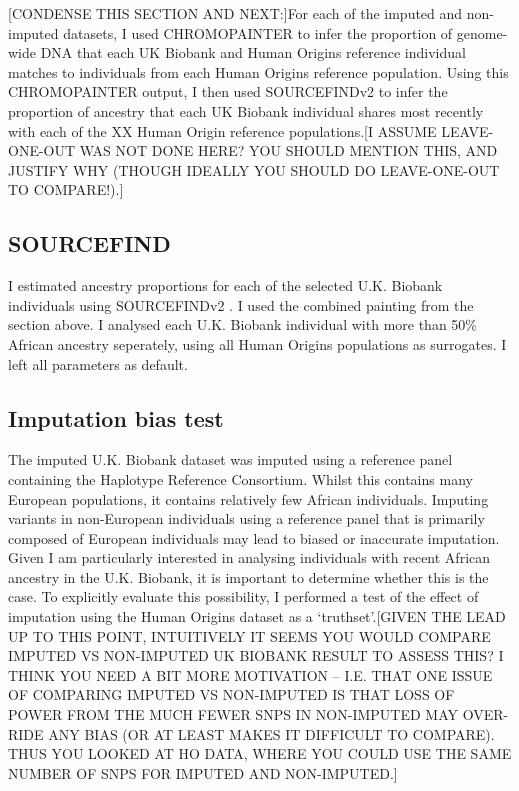 {{\color{red}[CONDENSE THIS SECTION AND NEXT:]For each of the imputed and non-imputed datasets, I used CHROMOPAINTER to infer the proportion of genome-wide DNA that each UK Biobank and Human Origins reference individual matches to individuals from each Human Origins reference population. Using this CHROMOPAINTER output, I then used SOURCEFINDv2 \cite{Chacon-Duque2018} to infer the proportion of ancestry that each UK Biobank individual shares most recently with each of the XX Human Origin reference populations.[I ASSUME LEAVE-ONE-OUT WAS NOT DONE HERE? YOU SHOULD MENTION THIS, AND JUSTIFY WHY (THOUGH IDEALLY YOU SHOULD DO LEAVE-ONE-OUT TO COMPARE!).]}


\subsection{SOURCEFIND}

I estimated ancestry proportions for each of the selected U.K. Biobank individuals using SOURCEFINDv2 \cite{Chacon-Duque2018}. I used the combined painting from the section above. I analysed each U.K. Biobank individual with more than 50\% African ancestry seperately, using all Human Origins populations as surrogates. I left all parameters as default. 

\subsection{Imputation bias test}

The imputed U.K. Biobank dataset was imputed using a reference panel containing the Haplotype Reference Consortium. Whilst this contains many European populations, it contains relatively few African individuals. Imputing variants in non-European individuals using a reference panel that is primarily composed of European individuals may lead to biased or inaccurate imputation. Given I am particularly interested in analysing individuals with recent African ancestry in the U.K. Biobank, it is important to determine whether this is the case. To explicitly evaluate this possibility, I performed a test of the effect of imputation using the Human Origins dataset as a `truthset'.{\color{red}[GIVEN THE LEAD UP TO THIS POINT, INTUITIVELY IT SEEMS YOU WOULD COMPARE IMPUTED VS NON-IMPUTED UK BIOBANK RESULT TO ASSESS THIS? I THINK YOU NEED A BIT MORE MOTIVATION -- I.E. THAT ONE ISSUE OF COMPARING IMPUTED VS NON-IMPUTED IS THAT LOSS OF POWER FROM THE MUCH FEWER SNPS IN NON-IMPUTED MAY OVER-RIDE ANY BIAS (OR AT LEAST MAKES IT DIFFICULT TO COMPARE). THUS YOU LOOKED AT HO DATA, WHERE YOU COULD USE THE SAME NUMBER OF SNPS FOR IMPUTED AND NON-IMPUTED.]}
 
}
